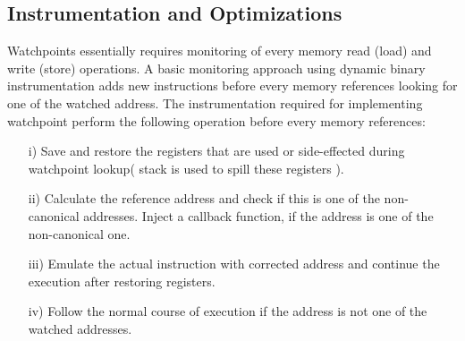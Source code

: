 

\subsection {Instrumentation and Optimizations}
Watchpoints essentially requires monitoring of every memory read (load) and write (store) operations. A basic monitoring approach using dynamic binary instrumentation adds new instructions before every memory references looking for one of the watched address. %
The instrumentation required for implementing watchpoint perform the following operation before every memory references: 

\begin{enumerate}
	\item[i)] Save and restore the registers that are used or side-effected during watchpoint lookup( stack is used to spill these registers ).
	\item[ii)] Calculate the reference address and check if this is one of the non-canonical addresses. Inject a callback function, if the address is one of the non-canonical one. 
	\item[iii)] Emulate the actual instruction with corrected address and continue the execution after restoring registers.
	\item[iv)] Follow the normal course of execution if the address is not one of the watched addresses.
\end{enumerate}

